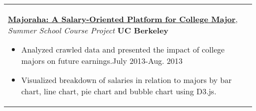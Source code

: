 \documentclass[a4paper,10pt]{article} %
\begin{document}
{\begin{tabular}{p{18.5cm}}
{\fontsize{11}{13.2}\textbf{\href{http://people.ischool.berkeley.edu/~charleswang/i153/final/facetBrowser/index.html}{Majoraha: A Salary-Oriented Platform for College Major}}}, {\it{Summer School Course Project}} \hfill \textbf{UC Berkeley} 
\vspace{0.5mm}
\begin{itemize}
\item Analyzed crawled data and presented the impact of college majors on future earnings.\hfill  July 2013-Aug. 2013
\item Visualized breakdown of salaries in relation to majors by bar chart, line chart, pie chart and bubble chart using D3.js. \vspace*{-\baselineskip}
\end{itemize}\\

%
\end{tabular}

}
\end{document}
